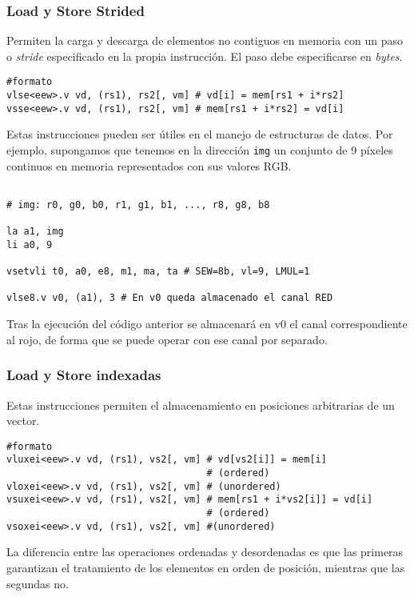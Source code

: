\subsubsection{Load y Store Strided}
Permiten la carga y descarga de elementos no contiguos en memoria con un paso o
\textit{stride} especificado en la propia instrucción. El paso debe
especificarse en \textit{bytes}.

\begin{lstlisting}
#formato
vlse<eew>.v vd, (rs1), rs2[, vm] # vd[i] = mem[rs1 + i*rs2]
vsse<eew>.v vd, (rs1), rs2[, vm] # mem[rs1 + i*rs2] = vd[i]
\end{lstlisting}

Estas instrucciones pueden ser útiles en el manejo de estructuras de datos. Por
ejemplo, supongamos que tenemos en la dirección \texttt{img} un conjunto de 9
píxeles continuos en memoria representados con sus valores RGB.

\begin{lstlisting}

# img: r0, g0, b0, r1, g1, b1, ..., r8, g8, b8

la a1, img
li a0, 9

vsetvli t0, a0, e8, m1, ma, ta # SEW=8b, vl=9, LMUL=1

vlse8.v v0, (a1), 3 # En v0 queda almacenado el canal RED

\end{lstlisting}

Tras la ejecución del código anterior se almacenará en v0 el canal correspondiente al rojo, de forma que
se puede operar con ese canal por separado.

\subsubsection{Load y Store indexadas}
Estas instrucciones permiten el almacenamiento en posiciones arbitrarias de un vector.

\begin{lstlisting}
#formato
vluxei<eew>.v vd, (rs1), vs2[, vm] # vd[vs2[i]] = mem[i]
                                   # (ordered)
vloxei<eew>.v vd, (rs1), vs2[, vm] # (unordered)
vsuxei<eew>.v vd, (rs1), vs2[, vm] # mem[rs1 + i*vs2[i]] = vd[i] 
                                   # (ordered)
vsoxei<eew>.v vd, (rs1), vs2[, vm] #(unordered)
\end{lstlisting}

La diferencia entre las operaciones ordenadas y desordenadas es que las
primeras garantizan el tratamiento de los elementos en orden de posición,
mientras que las segundas no.

